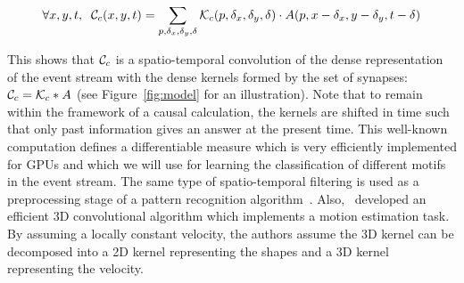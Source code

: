 \documentclass[default]{sn-jnl}%
\theoremstyle{thmstyleone}%
\theoremstyle{thmstyletwo}%
\theoremstyle{thmstylethree}%
\begin{document}
\begin{equation}\label{eq:kernel_b}
\forall x, y, t, \; \;
\mathcal{C}_c(x, y, t)
= \sum_{p, \delta_x, \delta_y, \delta} \mathcal{K}_c(p, \delta_x, \delta_y, \delta) \cdot A(p, x - \delta_x, y - \delta_y, t-\delta)
\end{equation}

This shows that $\mathcal{C}_c$ is a spatio-temporal convolution of the dense representation of the event stream with the dense kernels formed by the set of synapses:  $\mathcal{C}_c = \mathcal{K}_c \ast A$ (see Figure~\ref{fig:model} for an illustration). Note that to remain within the framework of a causal calculation, the kernels are shifted in time such that only past information gives an answer at the present time.
This well-known computation defines a differentiable measure which is very efficiently implemented for GPUs and which we will use for learning the classification of different motifs in the event stream. The same type of spatio-temporal filtering is used as a preprocessing stage of a pattern recognition algorithm~\citep{ghosh_spatiotemporal_2019}. Also,~\citet{sekikawa_constant_2018} developed an efficient 3D convolutional algorithm which implements a motion estimation task. By assuming a locally constant velocity, the authors assume the 3D kernel can be decomposed into a 2D kernel representing the shapes and a 3D kernel representing the velocity. 
\end{document}
